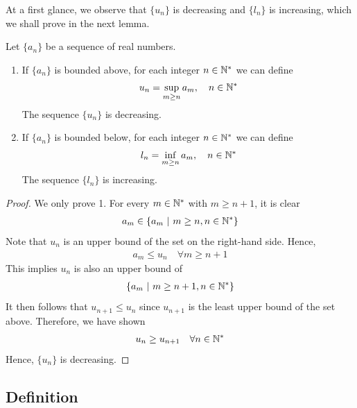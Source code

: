 \documentclass[thmcnt=section, 12pt]{my-elegantbook}
\begin{document}
At a first glance, we observe that $\{u_n\}$ is decreasing and $\{l_n\}$ is increasing, which we shall prove in the next lemma.

\begin{lemma} \label{lem:5}
    Let $\{a_n\}$ be a sequence of real numbers.
    \begin{enumerate}
        \item If $\{a_n\}$ is bounded above, for each integer $n \in \mathbb{N}^\ast$ we can define
        \begin{align*}
            u_n = \sup_{m \geq n} a_m,
            \quad n \in \mathbb{N}^\ast
        \end{align*}
        The sequence $\{u_n\}$ is decreasing.
        \item If $\{a_n\}$ is bounded below, for each integer $n \in \mathbb{N}^\ast$ we can define
        \begin{align*}
            l_n = \inf_{m \geq n} a_m,
            \quad n \in \mathbb{N}^\ast
        \end{align*}
        The sequence $\{l_n\}$ is increasing.
    \end{enumerate}
\end{lemma}

\begin{proof}
    We only prove 1. For every $m \in \mathbb{N}^\ast$ with $m \geq n+1$, it is clear
    \begin{align*}
        a_{m} \in \left\{ a_m \ \middle| \ m \geq n, n \in \mathbb{N}^\ast \right\}
    \end{align*}
    Note that $u_n$ is an upper bound of the set on the right-hand side. Hence, 
    \begin{align*}
        a_m \leq u_n
        \quad \forall m \geq n+1
    \end{align*}
    This implies $u_n$ is also an upper bound of 
    \begin{align*}
        \left\{ a_m \ \middle| \ m \geq n+1, n \in \mathbb{N}^\ast \right\}
    \end{align*}
    It then follows that $u_{n+1} \leq u_n$ since $u_{n+1}$ is the least upper bound of the set above. Therefore, we have shown 
    \begin{align*}
        u_{n} \geq u_{n+1}
        \quad \forall n \in \mathbb{N}^\ast
    \end{align*}
    Hence, $\{u_n\}$ is decreasing.
\end{proof}


\subsection{Definition}
\end{document}
